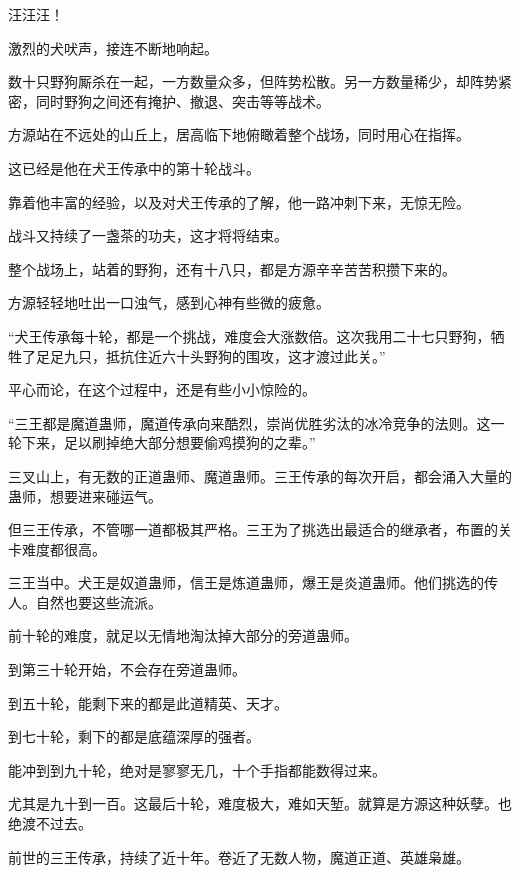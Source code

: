 
\begin{this_body}



汪汪汪！

激烈的犬吠声，接连不断地响起。

数十只野狗厮杀在一起，一方数量众多，但阵势松散。另一方数量稀少，却阵势紧密，同时野狗之间还有掩护、撤退、突击等等战术。

方源站在不远处的山丘上，居高临下地俯瞰着整个战场，同时用心在指挥。

这已经是他在犬王传承中的第十轮战斗。

靠着他丰富的经验，以及对犬王传承的了解，他一路冲刺下来，无惊无险。

战斗又持续了一盏茶的功夫，这才将将结束。

整个战场上，站着的野狗，还有十八只，都是方源辛辛苦苦积攒下来的。

方源轻轻地吐出一口浊气，感到心神有些微的疲惫。

“犬王传承每十轮，都是一个挑战，难度会大涨数倍。这次我用二十七只野狗，牺牲了足足九只，抵抗住近六十头野狗的围攻，这才渡过此关。”

平心而论，在这个过程中，还是有些小小惊险的。

“三王都是魔道蛊师，魔道传承向来酷烈，崇尚优胜劣汰的冰冷竞争的法则。这一轮下来，足以刷掉绝大部分想要偷鸡摸狗的之辈。”

三叉山上，有无数的正道蛊师、魔道蛊师。三王传承的每次开启，都会涌入大量的蛊师，想要进来碰运气。

但三王传承，不管哪一道都极其严格。三王为了挑选出最适合的继承者，布置的关卡难度都很高。

三王当中。犬王是奴道蛊师，信王是炼道蛊师，爆王是炎道蛊师。他们挑选的传人。自然也要这些流派。

前十轮的难度，就足以无情地淘汰掉大部分的旁道蛊师。

到第三十轮开始，不会存在旁道蛊师。

到五十轮，能剩下来的都是此道精英、天才。

到七十轮，剩下的都是底蕴深厚的强者。

能冲到到九十轮，绝对是寥寥无几，十个手指都能数得过来。

尤其是九十到一百。这最后十轮，难度极大，难如天堑。就算是方源这种妖孽。也绝渡不过去。

前世的三王传承，持续了近十年。卷近了无数人物，魔道正道、英雄枭雄。


\end{this_body}
